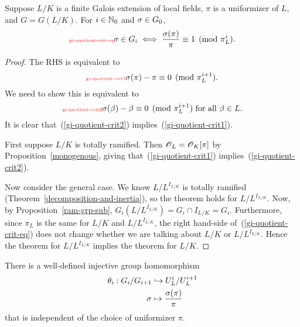 \begin{lem}
Suppose $L/K$ is a finite Galois extension of local fields, $\pi$ is a uniformizer of $L$, and $G=G(L/K)$. 
For $i\in \mathbb{N}_0$ and $\sigma\in G_0$,
\begin{equation}\llabel{gi-quotient-crit-eq}
\si\in G_i\iff \fc{\si(\pi)}{\pi}\equiv 1\pmod{\pi_L^i}.
\end{equation}
\end{lem}
\begin{proof}
The RHS is equivalent to 
\begin{equation}\llabel{gi-quotient-crit1}
\si(\pi)-\pi\equiv 0\pmod{\pi_L^{i+1}}.
\end{equation}
We need to show this is equivalent to
\begin{equation}\llabel{gi-quotient-crit2}
\si(\be)-\be\equiv 0\pmod{\pi_L^{i+1}}\text{ for all }\be\in L.
\end{equation}
It is clear that~(\ref{gi-quotient-crit2}) implies~(\ref{gi-quotient-crit1}).

First suppose $L/K$ is totally ramified. Then $\mathscr{O}_L=\mathscr{O}_K[\pi]$ by Proposition~\ref{monogenous}, giving that~(\ref{gi-quotient-crit1}) implies~(\ref{gi-quotient-crit2}).

Now consider the general case. We know $L/L^{I_{L/K}}$ is totally ramified (Theorem~\ref{decomposition-and-inertia}), so the theorem holds for $L/L^{I_{L/K}}$.
Now, by Proposition~\ref{ram-grp-sub},
 $G_i(L/L^{I_{L/K}})=G_i\cap I_{L/K}=G_i$. Furthermore, since $\pi_L$ is the same for $L/K$ and $L/L^{I_{L/K}}$, the right hand-side of~(\ref{gi-quotient-crit-eq}) does not change whether we are talking about $L/K$ or $L/L^{I_{L/K}}$. Hence the theorem for $L/L^{I_{L/K}}$ implies the theorem for $L/K$.
\end{proof}
\begin{pr}
There is a well-defined injective group homomorphism
\begin{align*}
\theta_i:G_i/G_{i+1}&\hookrightarrow U_L^i/U_L^{i+1}\\
\sigma&\mapsto \frac{\sigma(\pi)}{\pi}
\end{align*}
that is independent of the choice of uniformizer $\pi$.
\end{pr}
